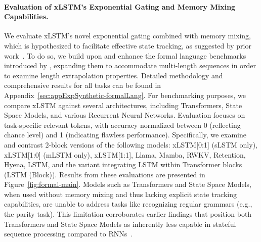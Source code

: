 \paragraph{Evaluation of xLSTM's Exponential Gating and Memory Mixing Capabilities.} We evaluate xLSTM's novel exponential gating combined with memory mixing, which is hypothesized to facilitate effective state tracking, as suggested by prior work~\citep{Merrill:24, Merrill:23}. To do so, we build upon and enhance the formal language benchmarks introduced by \citet{Deletang:23}, expanding them to accommodate multi-length sequences in order to examine length extrapolation properties. Detailed methodology and comprehensive results for all tasks can be found in Appendix~\ref{sec:appExpSynthetic-formalLang}. For benchmarking purposes, we compare xLSTM against several architectures, including Transformers, State Space Models, and various Recurrent Neural Networks. Evaluation focuses on task-specific relevant tokens, with accuracy normalized between 0 (reflecting chance level) and 1 (indicating flawless performance). Specifically, we examine and contrast 2-block versions of the following models: xLSTM[0:1] (sLSTM only), xLSTM[1:0] (mLSTM only), xLSTM[1:1], Llama, Mamba, RWKV, Retention, Hyena, LSTM, and the variant integrating LSTM within Transformer blocks (LSTM (Block)). Results from these evaluations are presented in Figure~\ref{fig:formal-main}. Models such as Transformers and State Space Models, when used without memory mixing and thus lacking explicit state tracking capabilities, are unable to address tasks like recognizing regular grammars (e.g., the parity task). This limitation corroborates earlier findings that position both Transformers and State Space Models as inherently less capable in stateful sequence processing compared to RNNs~\citep{Merrill:24, Merrill:23, Deletang:23}.

